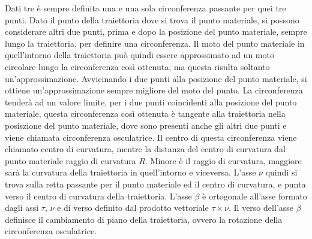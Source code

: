 \documentclass{article}
\numberwithin{equation}{subsection}
\begin{document}
Dati tre è sempre definita una e una sola circonferenza passante per quei tre punti. Dato il punto della traiettoria dove si trova il punto materiale, si possono considerare 
altri due punti, prima e dopo la posizione del punto materiale, sempre lungo la traiettoria, per definire una circonferenza. Il moto del punto materiale in quell'intorno della 
traiettoria può quindi essere approssimato ad un moto circolare lungo la circonferenza così ottenuta, ma questa risulta soltanto un'approssimazione. Avvicinando i due punti 
alla posizione del punto materiale, si ottiene un'approssimazione sempre migliore del moto del punto. La circonferenza tenderà ad un valore limite, per i due punti coincidenti 
alla posizione del punto materiale, questa circonferenza così ottenuta è tangente alla traiettoria nella posiszione del punto materiale, dove sono presenti anche gli altri due 
punti e viene chiamata circonferenza osculatrice. Il centro di questa circonferenza viene chiamato centro di curvatura, mentre la distanza del centro di curvatura dal punto 
materiale raggio di curvatura $R$. Minore è il raggio di curvatura, maggiore sarà la curvatura della traiettoria in quell'intorno e viceversa. L'asse $\nu$ quindi si trova 
sulla retta passante per il punto materiale ed il centro di curvatura, e punta verso il centro di curvatura della traiettoria. L'asse $\beta$ è ortogonale all'asse formato 
dagli assi $\tau,\,\nu$ e di verso definito dal prodotto vettoriale $\tau\times\nu$. Il verso dell'asse $\beta$ definisce il cambiamento di piano della traiettoria, ovvero 
la rotazione della circonferenza osculatrice. 
\end{document}
